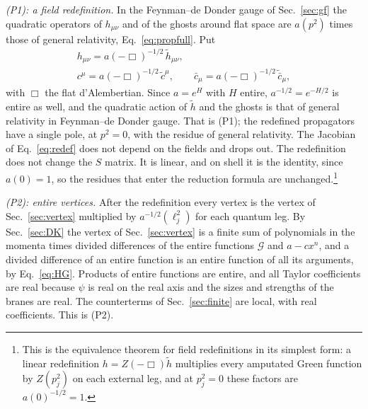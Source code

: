 \documentclass[aps,prd,10pt,twocolumn,superscriptaddress,nofootinbib,floatfix,longbibliography]{revtex4-2}
\begin{document}
\textit{(P1): a field redefinition.} In the Feynman--de Donder gauge of Sec.~\ref{sec:gf} the quadratic operators of $h_{\mu\nu}$ and of the ghosts around flat space are $a(p^2)$ times those of general relativity, Eq.~\eqref{eq:propfull}. Put
\begin{equation}
\label{eq:redef}
\begin{gathered}
h_{\mu\nu}=a(-\Box)^{-1/2}\,\tilde h_{\mu\nu},\\
c^\mu=a(-\Box)^{-1/2}\,\tilde c^\mu,\qquad \bar c_\mu=a(-\Box)^{-1/2}\,\tilde{\bar c}_\mu,
\end{gathered}
\end{equation}
with $\Box$ the flat d'Alembertian. Since $a=e^{H}$ with $H$ entire, $a^{-1/2}=e^{-H/2}$ is entire as well, and the quadratic action of $\tilde h$ and the ghosts is that of general relativity in Feynman--de Donder gauge. That is (P1); the redefined propagators have a single pole, at $p^2=0$, with the residue of general relativity. The Jacobian of Eq.~\eqref{eq:redef} does not depend on the fields and drops out. The redefinition does not change the $S$ matrix. It is linear, and on shell it is the identity, since $a(0)=1$, so the residues that enter the reduction formula are unchanged.\footnote{This is the equivalence theorem for field redefinitions in its simplest form: a linear redefinition $h=Z(-\Box)\tilde h$ multiplies every amputated Green function by $Z(p_j^2)$ on each external leg, and at $p_j^2=0$ these factors are $a(0)^{-1/2}=1$.}

\textit{(P2): entire vertices.} After the redefinition every vertex is the vertex of Sec.~\ref{sec:vertex} multiplied by $a^{-1/2}(\ell_j^2)$ for each quantum leg. By Sec.~\ref{sec:DK} the vertex of Sec.~\ref{sec:vertex} is a finite sum of polynomials in the momenta times divided differences of the entire functions $\mathcal G$ and $a-cx^n$, and a divided difference of an entire function is an entire function of all its arguments, by Eq.~\eqref{eq:HG}. Products of entire functions are entire, and all Taylor coefficients are real because $\psi$ is real on the real axis and the sizes and strengths of the branes are real. The counterterms of Sec.~\ref{sec:finite} are local, with real coefficients. This is (P2).
\end{document}
